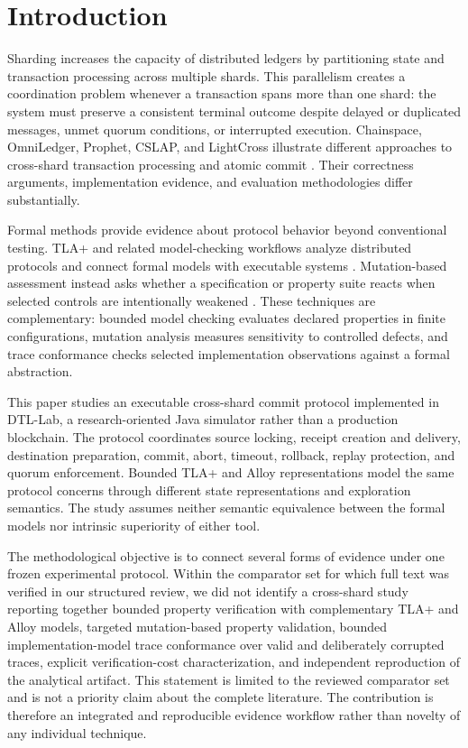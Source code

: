 \section{Introduction}
\label{sec:introduction}

Sharding increases the capacity of distributed ledgers by partitioning state
and transaction processing across multiple shards. This parallelism creates a
coordination problem whenever a transaction spans more than one shard: the
system must preserve a consistent terminal outcome despite delayed or
duplicated messages, unmet quorum conditions, or interrupted execution.
Chainspace, OmniLedger, Prophet, CSLAP, and LightCross illustrate different
approaches to cross-shard transaction processing and atomic commit
\cite{albassam2018chainspace,kokoriskogias2018omniledger,hong2023prophet,du2024cslap,qi2024lightcross}.
Their correctness arguments, implementation evidence, and evaluation
methodologies differ substantially.

Formal methods provide evidence about protocol behavior beyond conventional
testing. TLA+ and related model-checking workflows analyze distributed
protocols and connect formal models with executable systems
\cite{schultz2025mongodb,cirstea2025traces,hackett2025tracelink,howard2025ccf,wang2023mocket,gao2025imocket}.
Mutation-based assessment instead asks whether a specification or property
suite reacts when selected controls are intentionally weakened
\cite{cordy2023mutation}. These techniques are complementary: bounded model
checking evaluates declared properties in finite configurations, mutation
analysis measures sensitivity to controlled defects, and trace conformance
checks selected implementation observations against a formal abstraction.

This paper studies an executable cross-shard commit protocol implemented in
DTL-Lab, a research-oriented Java simulator rather than a production
blockchain. The protocol coordinates source locking, receipt creation and
delivery, destination preparation, commit, abort, timeout, rollback, replay
protection, and quorum enforcement. Bounded TLA+ and Alloy representations
model the same protocol concerns through different state representations and
exploration semantics. The study assumes neither semantic equivalence between
the formal models nor intrinsic superiority of either tool.

The methodological objective is to connect several forms of evidence under one
frozen experimental protocol. Within the comparator set for which full text was
verified in our structured review, we did not identify a cross-shard study
reporting together bounded property verification with complementary TLA+ and
Alloy models, targeted mutation-based property validation, bounded
implementation-model trace conformance over valid and deliberately corrupted
traces, explicit verification-cost characterization, and independent
reproduction of the analytical artifact. This statement is limited to the
reviewed comparator set and is not a priority claim about the complete
literature. The contribution is therefore an integrated and reproducible
evidence workflow rather than novelty of any individual technique.

